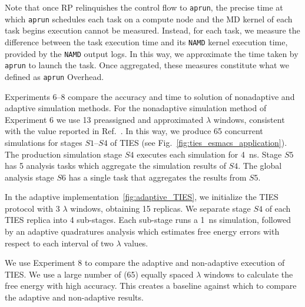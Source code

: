 Note that once RP relinquishes the control flow to \texttt{aprun}, the
precise time at which \texttt{aprun} schedules each task on a compute node
and the MD kernel of each task begins execution cannot be measured. Instead,
for each task, we measure the difference between the task execution time and
its \texttt{NAMD} kernel execution time, provided by the \texttt{NAMD} output
logs. In this way, we approximate the time taken by \texttt{aprun} to launch
the task. Once aggregated, these measures constitute what we defined as
\texttt{aprun} Overhead.

Experiments 6--8 compare the accuracy and time to solution of nonadaptive and
adaptive simulation methods. For the nonadaptive simulation method of
Experiment 6 we use 13 preassigned and approximated $\lambda$ windows,
consistent with the value reported in Ref.~\cite{Bhati2017}. In this way, we
produce 65 concurrent simulations for stages $S1$--$S4$ of TIES (see
Fig.~\ref{fig:ties_esmacs_application}). The production simulation stage $S4$
executes each simulation for \SI{4}{\nano\second}. Stage $S5$ has 5 analysis
tasks which aggregate the simulation results of $S4$. The global analysis
stage $S6$ has a single task that aggregates the results from $S5$.

In the adaptive implementation~\ref{fig:adaptive_TIES}, we initialize the
TIES protocol with 3 $\lambda$ windows, obtaining 15 replicas. We separate
stage $S4$ of each TIES replica into 4 sub-stages. Each sub-stage runs a
\SI{1}{\nano\second} simulation, followed by an adaptive quadratures analysis
which estimates free energy errors with respect to each interval of two
$\lambda$ values.


We use Experiment 8 to compare the adaptive and non-adaptive execution of
TIES. We use a large number of (65) equally spaced $\lambda$ windows to
calculate the free energy with high accuracy. This creates a baseline
against which to compare the adaptive and non-adaptive results.

